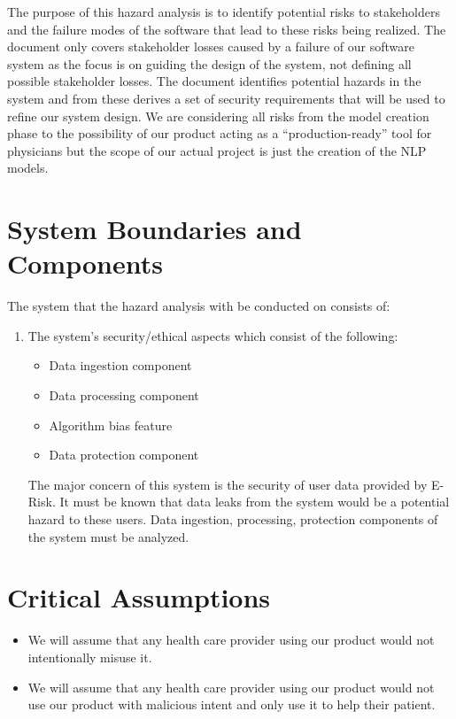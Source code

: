 \documentclass{article}
\begin{document}
The purpose of this hazard analysis is to identify potential risks to stakeholders and the failure modes of the software that lead to these risks being realized. The document only covers stakeholder losses caused by a failure of our software system as the focus is on guiding the design of the system, not defining all possible stakeholder losses. The document identifies potential hazards in the system and from these derives a set of security requirements that will be used to refine our system design. We are considering all risks from the model creation phase to the possibility of our product acting as a “production-ready” tool for physicians but the scope of our actual project is just the creation of the NLP models.


\section{System Boundaries and Components}


The system that the hazard analysis with be conducted on consists of:
\begin{enumerate}
   \item The system's security/ethical aspects which consist of the following:
         \begin{itemize}
             \item Data ingestion component
             \item Data processing component
             \item Algorithm bias feature
             \item Data protection component
         \end{itemize}
   The major concern of this system is the security of user data provided by E-Risk. It must be known that data leaks from the system would be a potential hazard to these users. Data ingestion, processing, protection components of the system must be analyzed.
\end{enumerate}


\section{Critical Assumptions}


\begin{itemize}
   \item We will assume that any health care provider using our product would not intentionally misuse it.
   \item We will assume that any health care provider using our product would not use our product with malicious intent and only use it to help their patient.
 \end{itemize}
\end{document}
